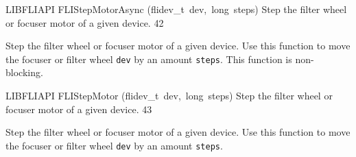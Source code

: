 \documentclass{article}
\begin{document}
\begin{cxxfunction}
{LIBFLIAPI}
        {FLIStepMotorAsync}
        {(flidev\_t\ dev,\ long\ steps)}
        {
 Step the filter wheel or focuser motor of a given device.}
        {42}
\begin{cxxdoc}

Step the filter wheel or focuser motor of a given device.  Use this
function to move the focuser or filter wheel \texttt{dev} by an
amount \texttt{steps}. This function is non-blocking.


\end{cxxdoc}
\end{cxxfunction}
\begin{cxxfunction}
{LIBFLIAPI}
        {FLIStepMotor}
        {(flidev\_t\ dev,\ long\ steps)}
        {
 Step the filter wheel or focuser motor of a given device.}
        {43}
\begin{cxxdoc}

Step the filter wheel or focuser motor of a given device.  Use this
function to move the focuser or filter wheel \texttt{dev} by an
amount \texttt{steps}.


\end{cxxdoc}
\end{cxxfunction}
\end{document}
